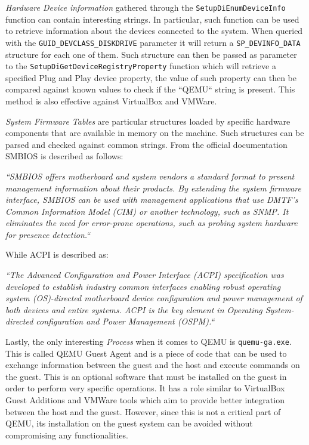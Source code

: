 \textit{Hardware Device information} gathered through the \lstinline{SetupDiEnumDeviceInfo} function can contain interesting strings. In particular, such function can be used to retrieve information about the devices connected to the system. When queried with the \lstinline{GUID_DEVCLASS_DISKDRIVE} parameter it will return a \lstinline{SP_DEVINFO_DATA} structure for each one of them. Such structure can then be passed as parameter to the \lstinline{SetupDiGetDeviceRegistryProperty} function which will retrieve a specified Plug and Play device property, the value of such property can then be compared against known values to check if the ``QEMU`` string is present. This method is also effective against VirtualBox and VMWare.

\textit{System Firmware Tables} are particular structures loaded by specific hardware components that are available in memory on the machine. Such structures can be parsed and checked against common strings. From the official documentation SMBIOS is described as follows:

\textit{``SMBIOS offers motherboard and system vendors a standard format to present management information about their products. By extending the system firmware interface, SMBIOS can be used with management applications that use DMTF’s Common Information Model (CIM)  or another technology, such as SNMP. It eliminates the need for error-prone operations, such as probing system hardware for presence detection.``}~\cite{smbios}

While ACPI is described as:

\textit{``The Advanced Configuration and Power Interface (ACPI) specification was developed to establish industry common interfaces enabling robust operating system (OS)-directed motherboard device configuration and power management of both devices and entire systems.  ACPI is the key element in Operating System-directed configuration and Power Management (OSPM).``}~\cite{acpi}

Lastly, the only interesting \textit{Process} when it comes to QEMU is \lstinline{quemu-ga.exe}. This is called QEMU Guest Agent and is a piece of code that can be used to exchange information between the guest and the host and execute commands on the guest. This is an optional software that must be installed on the guest in order to perform very specific operations. It has a role similar to VirtualBox Guest Additions and VMWare tools which aim to provide better integration between the host and the guest. However, since this is not a critical part of QEMU, its installation on the guest system can be avoided without compromising any functionalities.  

